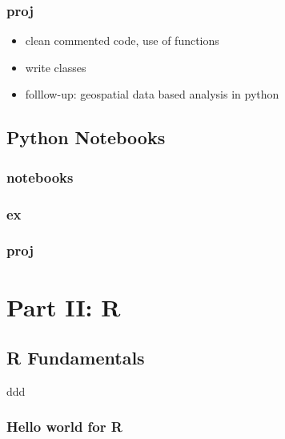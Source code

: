 \documentclass[
]{book}
\providecommand{\tightlist}{%
  \setlength{\itemsep}{0pt}\setlength{\parskip}{0pt}}
\begin{document}
\hypertarget{proj-1}{%
\section{proj}\label{proj-1}}

\begin{itemize}
\tightlist
\item
  clean commented code, use of functions
\item
  write classes
\item
  folllow-up: geospatial data based analysis in python
\end{itemize}

\hypertarget{python-notebooks}{%
\chapter{Python Notebooks}\label{python-notebooks}}

\hypertarget{notebooks}{%
\section{notebooks}\label{notebooks}}

\hypertarget{ex-1}{%
\section{ex}\label{ex-1}}

\hypertarget{proj-2}{%
\section{proj}\label{proj-2}}

\hypertarget{part-part-ii-r}{%
\part*{Part II: R}\label{part-part-ii-r}}

\hypertarget{r-fundamentals}{%
\chapter{R Fundamentals}\label{r-fundamentals}}

ddd

\hypertarget{hello-world-for-r}{%
\section{Hello world for R}\label{hello-world-for-r}}

  
\end{document}
